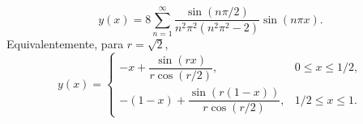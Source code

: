 \[y(x)=8\sum_{n=1}^\infty\frac{\sin(n\pi/2)}{n^2\pi^2(n^2\pi^2-2)}\sin(n\pi x).\]
Equivalentemente, para $r=\sqrt2$,
\[y(x)=\begin{cases}-x+\dfrac{\sin(rx)}{r\cos(r/2)},&0\le x\le1/2,\\-(1-x)+\dfrac{\sin(r(1-x))}{r\cos(r/2)},&1/2\le x\le1.\end{cases}\]
